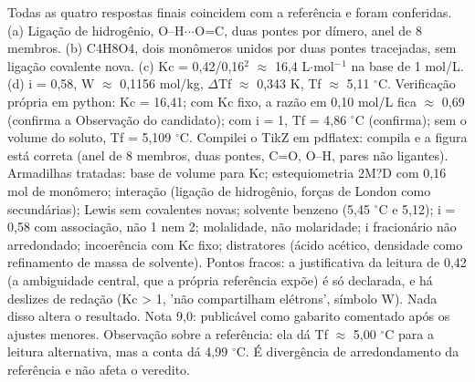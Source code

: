 \documentclass{article}%
\begin{document}
Todas as quatro respostas finais coincidem com a referência e foram conferidas. (a) Ligação de hidrogênio, O--H$\cdot$$\cdot$$\cdot$O=C, duas pontes por dímero, anel de 8 membros. (b) C4H8O4, dois monômeros unidos por duas pontes tracejadas, sem ligação covalente nova. (c) Kc = 0,42/0,16$^2$ $\approx$ 16,4 L$\cdot$mol$^{-}$$^{1}$ na base de 1 mol/L. (d) i = 0,58, W $\approx$ 0,1156 mol/kg, $\Delta$Tf $\approx$ 0,343 K, Tf $\approx$ 5,11 $^\circ$C.\newline%
\newline%
Verificação própria em python: Kc = 16,41; com Kc fixo, a razão em 0,10 mol/L fica $\approx$ 0,69 (confirma a Observação do candidato); com i = 1, Tf = 4,86 $^\circ$C (confirma); sem o volume do soluto, Tf = 5,109 $^\circ$C. Compilei o TikZ em pdflatex: compila e a figura está correta (anel de 8 membros, duas pontes, C=O, O--H, pares não ligantes).\newline%
\newline%
Armadilhas tratadas: base de volume para Kc; estequiometria 2M?D com 0,16 mol de monômero; interação (ligação de hidrogênio, forças de London como secundárias); Lewis sem covalentes novas; solvente benzeno (5,45 $^\circ$C e 5,12); i = 0,58 com associação, não 1 nem 2; molalidade, não molaridade; i fracionário não arredondado; incoerência com Kc fixo; distratores (ácido acético, densidade como refinamento de massa de solvente).\newline%
\newline%
Pontos fracos: a justificativa da leitura de 0,42 (a ambiguidade central, que a própria referência expõe) é só declarada, e há deslizes de redação (Kc > 1, 'não compartilham elétrons', símbolo W). Nada disso altera o resultado. Nota 9,0: publicável como gabarito comentado após os ajustes menores.\newline%
\newline%
Observação sobre a referência: ela dá Tf $\approx$ 5,00 $^\circ$C para a leitura alternativa, mas a conta dá 4,99 $^\circ$C. É divergência de arredondamento da referência e não afeta o veredito.%
$$
\end{document}
